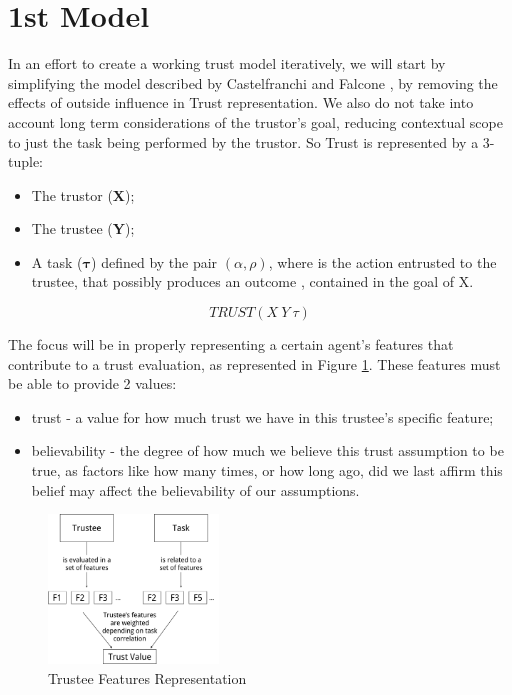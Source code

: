 \section{1st Model}
\label{sec:Model}

In an effort to create a working trust model iteratively, we will start by simplifying the model described by Castelfranchi and Falcone \cite{Castelfranchi1998}, by removing the effects of outside influence in Trust representation. We also do not take into account long term considerations of the trustor's goal, reducing contextual scope to just the task being performed by the trustor. So Trust is represented by a 3-tuple:

\begin{itemize}
	\item The trustor (\textbf{X});
	\item The trustee (\textbf{Y});
	\item A task ($\bm{\tau}$) defined by the pair $(\alpha, \rho)$, where \bm{$\alpha$} is the action entrusted to the trustee, that possibly produces an outcome \bm{$\rho$}, contained in the goal of X.
\end{itemize}
\begin{equation}
TRUST(X\ Y\ \tau)
\label{eq:TrustRelation}
\end{equation}

The focus will be in properly representing a certain agent's features that contribute to a trust evaluation, as represented in Figure \ref{fig:trustee}. These features must be able to provide 2 values:
\begin{itemize}
	\item trust - a value for how much trust we have in this trustee's specific feature;
	\item believability - the degree of how much we believe this trust assumption to be true, as factors like how many times, or how long ago, did we last affirm this belief may affect the believability of our assumptions.
\end{itemize}
\begin{figure}[hbt]
	\centering
	\includegraphics[height=150px]{figures/Trust_Model_Diagram.png}
	\caption{Trustee Features Representation}
	\label{fig:trustee}
\end{figure}

